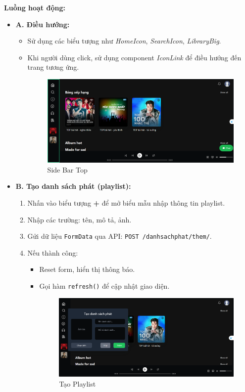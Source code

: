 \textbf{Luồng hoạt động:}
\begin{itemize}
  \item \textbf{A. Điều hướng:}
  \begin{itemize}
    \item Sử dụng các biểu tượng như \textit{HomeIcon}, \textit{SearchIcon}, \textit{LibraryBig}.
    \item Khi người dùng click, sử dụng component \textit{IconLink} để điều hướng đến trang tương ứng.
    \begin{figure}[H]
        \centering
        \includegraphics[width=1\textwidth]{imgs/trienkhaife/sidebartop.png}
        \caption{Side Bar Top}
    \end{figure}
  \end{itemize}

  \item \textbf{B. Tạo danh sách phát (playlist):}
  \begin{enumerate}
    \item Nhấn vào biểu tượng \textbf{+} để mở biểu mẫu nhập thông tin playlist.
    \item Nhập các trường: tên, mô tả, ảnh.
    \item Gửi dữ liệu \texttt{FormData} qua API: \texttt{POST /danhsachphat/them/}.
    \item Nếu thành công:
    \begin{itemize}
      \item Reset form, hiển thị thông báo.
      \item Gọi hàm \texttt{refresh()} để cập nhật giao diện.
      \begin{figure}[H]
        \centering
        \includegraphics[width=1\textwidth]{imgs/trienkhaife/createPlaylist.png}
        \caption{Tạo Playlist}
      \end{figure}
    \end{itemize}
  \end{enumerate}


\end{itemize}
